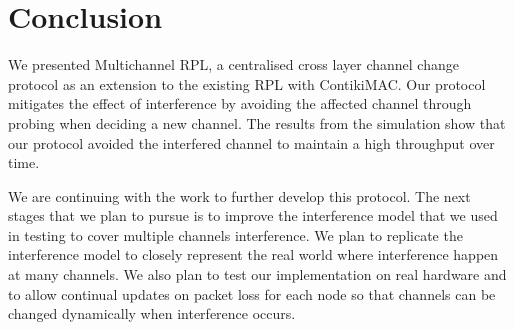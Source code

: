 \section{Conclusion}


We presented Multichannel RPL, a centralised cross layer channel change protocol as an extension to the existing RPL with ContikiMAC. Our protocol mitigates the effect of interference by avoiding the affected channel through probing when deciding a new channel. The results from the simulation show that our protocol avoided the interfered channel to maintain a high throughput over time. 

We are continuing with the work to further develop this protocol. The next stages that we plan to pursue is to improve the interference model that we used in testing to cover multiple channels interference. We plan to replicate the interference model to closely represent the real world where interference happen at many channels. We also plan to test our implementation on real hardware and to allow continual updates on packet loss for each node so that channels can be changed dynamically when interference occurs.


